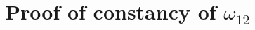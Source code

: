 \documentclass[11pt,a4paper]{article}
\numberwithin{equation}{section}
\theoremstyle{journalplain}
\theoremstyle{journaldef}
\newcommand{\dd}{\,\mathrm d}
\newcommand{\pd}{\partial}
\begin{document}

\section{Proof of constancy of $\omega_{12}$}
\end{document}
